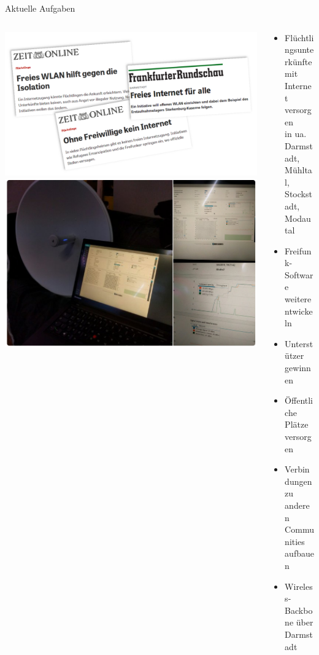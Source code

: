 \documentclass[10pt]{beamer}
\begin{document}
  \begin{frame}{Aktuelle Aufgaben}
    \begin{columns}[T]
      \begin{column}{5cm}
        \includegraphics[width=\textwidth]{images/2015-10_presse-fluechtlinge}
        \vspace{1em}
        \includegraphics[width=\textwidth]{images/powerbeam-mit-laptop}
      \end{column}
      \begin{column}{7cm}
      \begin{itemize}
        \item \large Flüchtlingsunterkünfte mit Internet versorgen\\
        \tiny in ua. Darmstadt, Mühltal, Stockstadt, Modautal\\
        \end{itemize}
        \begin{itemize}
          \item Freifunk-Software weiterentwickeln
          \item Unterstützer gewinnen
          \item Öffentliche Plätze versorgen
          \item Verbindungen zu anderen Communities aufbauen
          \item Wireless-Backbone über Darmstadt
        \end{itemize}
        \end{column}
      \end{columns}
    \end{frame}
\end{document}
